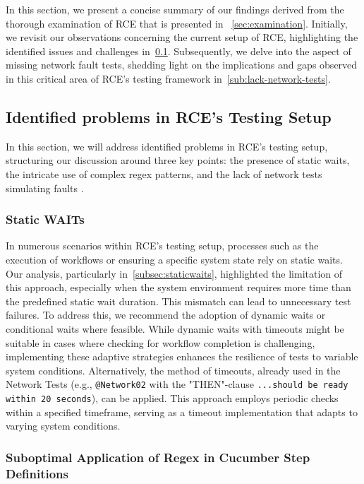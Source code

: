 In this section, we present a concise summary of our findings derived from the thorough examination of \ac{RCE} that is presented in ~\cref{sec:examination}. Initially, we revisit our observations concerning the current setup of RCE, highlighting the identified issues and challenges in~\cref{sub:identified-problems}. Subsequently, we delve into the aspect of missing network fault tests, shedding light on the implications and gaps observed in this critical area of RCE's testing framework in~\cref{sub:lack-network-tests}. 

\subsection{Identified problems in RCE's Testing Setup}
\label{sub:identified-problems}
In this section, we will address identified problems in RCE's testing setup, structuring our discussion around three key points: the presence of static waits, the intricate use of complex regex patterns, and the lack of network tests simulating faults
.
\subsubsection{Static WAITs}
In numerous scenarios within \ac{RCE}'s testing setup, processes such as the execution of workflows or ensuring a specific system state rely on static waits. Our analysis, particularly in~\cref{subsec:staticwaits}, highlighted the limitation of this approach, especially when the system environment requires more time than the predefined static wait duration. This mismatch can lead to unnecessary test failures. To address this, we recommend the adoption of dynamic waits or conditional waits where feasible. While dynamic waits with timeouts might be suitable in cases where checking for workflow completion is challenging, implementing these adaptive strategies enhances the resilience of tests to variable system conditions. Alternatively, the method of timeouts, already used in the Network Tests (e.g., \verb|@Network02| with the "THEN"-clause \verb|...should be ready within 20 seconds|), can be applied. This approach employs periodic checks within a specified timeframe, serving as a timeout implementation that adapts to varying system conditions.


\subsubsection{Suboptimal Application of Regex in Cucumber Step Definitions}
\label{subsec:resultCucumber}

